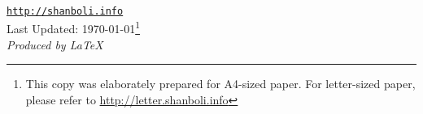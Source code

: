 \newpage
\
\vspace{17 cm}
\begin{figure}[h]
\hspace{1.43in}
\end{figure}
\begin{narrow}{0.15in}{1.5in}
\begin{center}
\href{http://shanboli.info}{\tt http://shanboli.info}\\
\vspace{0.15in}
Last Updated: \today\footnote{This copy was elaborately prepared for A4-sized paper. For letter-sized paper, please refer to \href{http://letter.shanboli.info}
{http://letter.shanboli.info}}\\
\vspace{0.15in}
\textit{Produced by \LaTeX}
\end{center}
\end{narrow}
